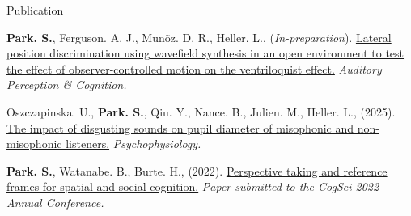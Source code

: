 \documentclass{resume} %
\begin{document}
\begin{rSection}{Publication}
	\setlength{\hangingindent}{1.27cm}
	
	\begin{hangingpar}
		
		\textbf{Park. S.}, Ferguson. A. J., Mun\~oz. D. R., Heller. L., (\textit{In-preparation}). \href{}{Lateral position discrimination using wavefield synthesis in an open environment to test the effect of observer-controlled motion on the ventriloquist effect.}
		\textit{Auditory Perception \& Cognition.}
		
	\end{hangingpar}
	
	\begin{hangingpar}
		
		Oszczapinska. U., \textbf{Park. S.}, Qiu. Y., Nance. B., Julien. M., Heller. L., (2025). \href{https://doi.org/10.1111/psyp.70014}{The impact of disgusting sounds on pupil diameter of misophonic and non-misophonic listeners.}
		\textit{Psychophysiology.}
		
		
	\end{hangingpar}
	
	\begin{hangingpar}
		
		\textbf{Park. S.}, Watanabe. B., Burte. H., (2022). 
		\href{https://escholarship.org/uc/item/6wq5x6nn}{Perspective taking and reference frames for spatial and social cognition.} 
		\em{Paper submitted to the CogSci 2022 Annual Conference.}
		
	\end{hangingpar}
	
\end{rSection}
\end{document}
